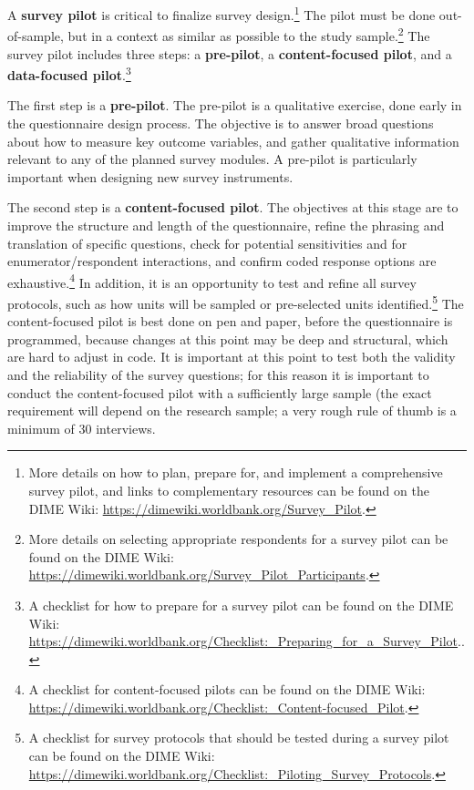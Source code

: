 \documentclass[
]{book}
\begin{document}
A \textbf{survey pilot} is critical to finalize survey design.\footnote{More details on
  how to plan, prepare for, and implement a comprehensive survey pilot,
  and links to complementary resources can be found on the DIME Wiki:
  \url{https://dimewiki.worldbank.org/Survey_Pilot}.}
The pilot must be done out-of-sample,
but in a context as similar as possible to the study sample.\footnote{More details on selecting appropriate respondents for a survey pilot
  can be found on the DIME Wiki:
  \url{https://dimewiki.worldbank.org/Survey_Pilot_Participants}.}
The survey pilot includes three steps:
a \textbf{pre-pilot}, a \textbf{content-focused pilot}, and a \textbf{data-focused pilot}.\footnote{A checklist for how to prepare for a survey pilot can be found on the DIME Wiki:
  \url{https://dimewiki.worldbank.org/Checklist:_Preparing_for_a_Survey_Pilot}..}

The first step is a \textbf{pre-pilot}.
The pre-pilot is a qualitative exercise, done early in the questionnaire design process.
The objective is to answer broad questions about how to measure key outcome variables,
and gather qualitative information relevant to any of the planned survey modules.
A pre-pilot is particularly important when designing new survey instruments.

The second step is a \textbf{content-focused pilot}.
The objectives at this stage are to improve the structure and length of the questionnaire,
refine the phrasing and translation of specific questions,
check for potential sensitivities and for enumerator/respondent interactions,
and confirm coded response options are exhaustive.\footnote{A checklist for content-focused pilots can be found on the DIME Wiki:
  \url{https://dimewiki.worldbank.org/Checklist:_Content-focused_Pilot}.}
In addition, it is an opportunity to test and refine all survey protocols,
such as how units will be sampled or pre-selected units identified.\footnote{A checklist for survey protocols that should be tested during a survey pilot
  can be found on the DIME Wiki:
  \url{https://dimewiki.worldbank.org/Checklist:_Piloting_Survey_Protocols}.}
The content-focused pilot is best done on pen and paper, before the questionnaire is programmed,
because changes at this point may be deep and structural,
which are hard to adjust in code.
It is important at this point to test both the validity and the reliability
of the survey questions;
for this reason it is important to conduct the content-focused pilot
with a sufficiently large sample (the exact requirement will depend on the research sample;
a very rough rule of thumb is a minimum of 30 interviews.
\end{document}
